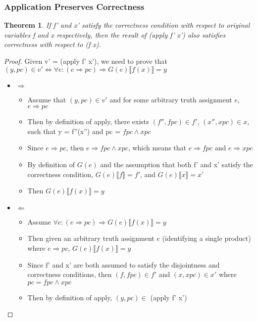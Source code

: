 \documentclass[11pt]{article} %
\begin{document}
\subsubsection{Application Preserves Correctness}

\newtheorem{th2}{Theorem}
\begin{th2}
If f' and x' satisfy the correctness condition with respect to original variables f and x respectively, then the result of (apply f' x') also satisfies correctness with respect to (f x).
\end{th2}

\begin{proof}
Given v' = (apply f' x'), we need to prove that $(y, pc) \in v' \Leftrightarrow \forall e:{(e \Rightarrow pc) \Rightarrow G(e) \llbracket f(x) \rrbracket = y}$
\begin{itemize}
\item{$\Rightarrow$}
	\begin{itemize}
	\item Assume that $(y,pc) \in v'$ and for some arbitrary truth assignment $e$, $e \Rightarrow pc$
	\item Then by definition of apply, there exists $(f'', fpc) \in f'$, $(x'', xpc) \in x$, such that y = f''(x'') and pc = $fpc \wedge xpc$
	\item Since $e \Rightarrow pc$, then $e \Rightarrow fpc \wedge xpc$, which means that $e \Rightarrow fpc$ and $e \Rightarrow xpc$
	\item By definition of $G(e)$ and the assumption that both f' and x' satisfy the correctness condition, $G(e) \llbracket f \rrbracket = f'$, and $G(e) \llbracket x \rrbracket = x'$
	\item Then $G(e) \llbracket f(x) \rrbracket = y$
	\end{itemize}
\item{$\Leftarrow$}
	\begin{itemize}
	\item Assume $\forall e:{(e \Rightarrow pc) \Rightarrow G(e) \llbracket f(x) \rrbracket = y}$
	\item Then given an arbitrary truth assignment $e$ (identifying a single product) where $e \Rightarrow pc$, $G(e) \llbracket f(x) \rrbracket = y$
	\item Since f' and x' are both assumed to satisfy the disjointness and correctness conditions, then $(f,fpc) \in f'$ and $(x,xpc) \in x'$ where $pc = fpc \wedge xpc$
	\item Then by definition of apply, $(y,pc) \in$ (apply f' x')
	\end{itemize}
\end{itemize}

\end{proof}
\end{document}
